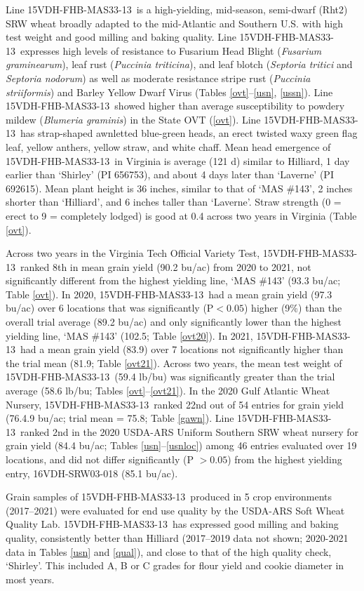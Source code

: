 \documentclass[12pt, letterpaper]{article}
\newcommand{\lin}{15VDH-FHB-MAS33-13~}
\begin{document}
Line \lin is a high-yielding, mid-season, semi-dwarf (Rht2) SRW wheat broadly adapted to the mid-Atlantic and Southern U.S. with high test weight and good milling and baking quality. Line \lin expresses high levels of resistance to Fusarium Head Blight (\textit{Fusarium graminearum}), leaf rust (\textit{Puccinia triticina}), and leaf blotch (\textit{Septoria tritici} and \textit{Septoria nodorum}) as well as moderate resistance stripe rust (\textit{Puccinia striiformis}) and Barley Yellow Dwarf Virus (Tables \ref{ovt}--\ref{usn}, \ref{ussn}). Line \lin showed higher than average susceptibility to powdery mildew (\textit{Blumeria graminis}) in the State OVT (\ref{ovt}). Line \lin has strap-shaped awnletted blue-green heads, an erect twisted waxy green flag leaf, yellow anthers, yellow straw, and white chaff. Mean head emergence of \lin in Virginia is average (121 d) similar to Hilliard, 1 day earlier than `Shirley' (PI 656753), and about 4 days later than `Laverne' (PI 692615). Mean plant height is 36 inches, similar to that of `MAS \#143', 2 inches shorter than `Hilliard', and 6 inches taller than `Laverne'. Straw strength (0 = erect to 9 = completely lodged) is good at 0.4 across two years in Virginia (Table \ref{ovt}). 

Across two years in the Virginia Tech Official Variety Test, \lin ranked 8th in mean grain yield (90.2 bu/ac) from 2020 to 2021, not significantly different from the highest yielding line, `MAS \#143' (93.3 bu/ac; Table \ref{ovt}). In 2020, \lin had a mean grain yield (97.3 bu/ac) over 6 locations that was significantly (P$<0.05$) higher (9\%) than the overall trial average (89.2 bu/ac) and only significantly lower than the highest yielding line, `MAS \#143' (102.5; Table \ref{ovt20}). In 2021, \lin had a mean grain yield (83.9) over 7 locations not significantly higher than the trial mean (81.9; Table \ref{ovt21}).  Across two years, the mean test weight of \lin (59.4 lb/bu) was significantly greater than the trial average (58.6 lb/bu; Tables \ref{ovt}--\ref{ovt21}). In the 2020 Gulf Atlantic Wheat Nursery, \lin ranked 22nd out of 54 entries for grain yield (76.4.9 bu/ac; trial mean = 75.8; Table \ref{gawn}). Line \lin ranked 2nd in the 2020 USDA-ARS Uniform Southern SRW wheat nursery for grain yield (84.4 bu/ac; Tables \ref{usn}--\ref{usnloc}) among 46 entries evaluated over 19 locations, and did not differ significantly (P $> 0.05$) from the highest yielding entry, 16VDH-SRW03-018 (85.1 bu/ac). 

Grain samples of \lin produced in 5 crop environments (2017--2021) were evaluated for end use quality by the USDA-ARS Soft Wheat Quality Lab.  \lin has expressed good milling and baking quality, consistently better than Hilliard (2017--2019 data not shown; 2020-2021 data in Tables \ref{usn} and \ref{qual}), and close to that of the high quality check, `Shirley'. This included A, B or C grades for flour yield and cookie diameter in most years. 
\end{document}
